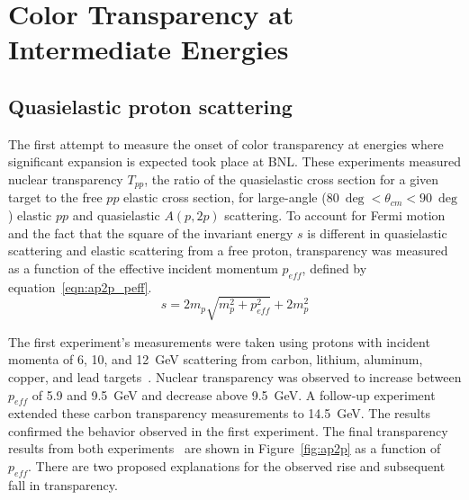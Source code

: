 \section{Color Transparency at Intermediate Energies}
\label{sec:ct_intermediate_energies}

\subsection{Quasielastic proton scattering}
The first attempt to measure the onset of color transparency at energies where
significant expansion is expected took place at BNL.
These experiments measured nuclear transparency $T_{pp}$,
the ratio of the quasielastic cross section for a given target to the free $pp$
elastic cross section, for large-angle
($\SI{80}{\deg} < \theta_{cm} < \SI{90}{\deg}$) elastic $pp$ and quasielastic
$A(p,2p)$ scattering.
To account for Fermi motion and the fact that the square of the invariant
energy $s$ is different in quasielastic scattering and elastic scattering
from a free proton, transparency was measured as a function of the effective
incident momentum $p_{eff}$, defined by equation~\ref{eqn:ap2p_peff}.
\begin{equation} \label{eqn:ap2p_peff}
    s = 2 m_p \sqrt{m_p^2 + p_{eff}^2} + 2m_p^2
\end{equation}

The first experiment's measurements were taken using protons with incident
momenta of 6, 10, and \SI{12}{\giga\electronvolt} scattering from carbon,
lithium, aluminum, copper, and lead targets~\cite{Carroll_1988}.
Nuclear transparency was observed to increase between $p_{eff}$ of 5.9 and
\SI{9.5}{\giga\electronvolt} and decrease above \SI{9.5}{\giga\electronvolt}.
A follow-up experiment~\cite{Mardor_1998, Leksanov_2001} extended these
carbon transparency measurements to \SI{14.5}{\giga\electronvolt}.
The results confirmed the behavior observed in the first experiment.
The final transparency results from both experiments~\cite{Aclander_2004} are
shown in Figure~\ref{fig:ap2p} as a function of $p_{eff}$.
There are two proposed explanations for the observed rise and subsequent fall
in transparency.

